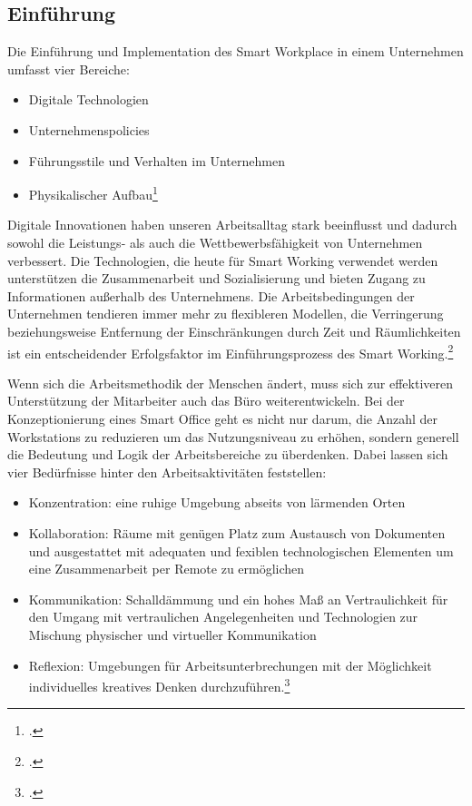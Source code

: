 \newpage
\subsection{Einführung}
Die Einführung und Implementation des Smart Workplace in einem Unternehmen umfasst vier Bereiche:

\begin{itemize}
\item[1.] Digitale Technologien
\item[2.] Unternehmenspolicies
\item[3.] Führungsstile und Verhalten im Unternehmen
\item[4.] Physikalischer Aufbau\footcite[Vgl.][]{efm}
\end{itemize}

Digitale Innovationen haben unseren Arbeitsalltag stark beeinflusst und dadurch sowohl die Leistungs- als auch die Wettbewerbsfähigkeit von Unternehmen verbessert. Die Technologien, die heute für Smart Working verwendet werden unterstützen die Zusammenarbeit und Sozialisierung und bieten Zugang zu Informationen außerhalb des Unternehmens. Die Arbeitsbedingungen der Unternehmen tendieren immer mehr zu flexibleren Modellen, die Verringerung beziehungsweise Entfernung der Einschränkungen durch Zeit und Räumlichkeiten ist ein entscheidender Erfolgsfaktor im Einführungsprozess des Smart Working.\footcite[Vgl.][]{efm}

Wenn sich die Arbeitsmethodik der Menschen ändert, muss sich zur effektiveren Unterstützung der Mitarbeiter auch das Büro weiterentwickeln. Bei der Konzeptionierung eines Smart Office geht es nicht nur darum, die Anzahl der Workstations zu reduzieren um das Nutzungsniveau zu erhöhen, sondern generell die Bedeutung und Logik der Arbeitsbereiche zu überdenken. Dabei lassen sich vier Bedürfnisse hinter den Arbeitsaktivitäten feststellen:

\begin{itemize}
\item Konzentration: eine ruhige Umgebung abseits von lärmenden Orten
\item Kollaboration: Räume mit genügen Platz zum Austausch von Dokumenten und ausgestattet mit adequaten und fexiblen technologischen Elementen um eine  Zusammenarbeit per Remote zu ermöglichen
\item Kommunikation: Schalldämmung und ein hohes Maß an Vertraulichkeit für den Umgang mit vertraulichen Angelegenheiten und Technologien zur Mischung physischer und virtueller Kommunikation
\item Reflexion: Umgebungen für Arbeitsunterbrechungen mit der Möglichkeit individuelles kreatives Denken durchzuführen.\footcite[Vgl.][]{efm}
\end{itemize}

